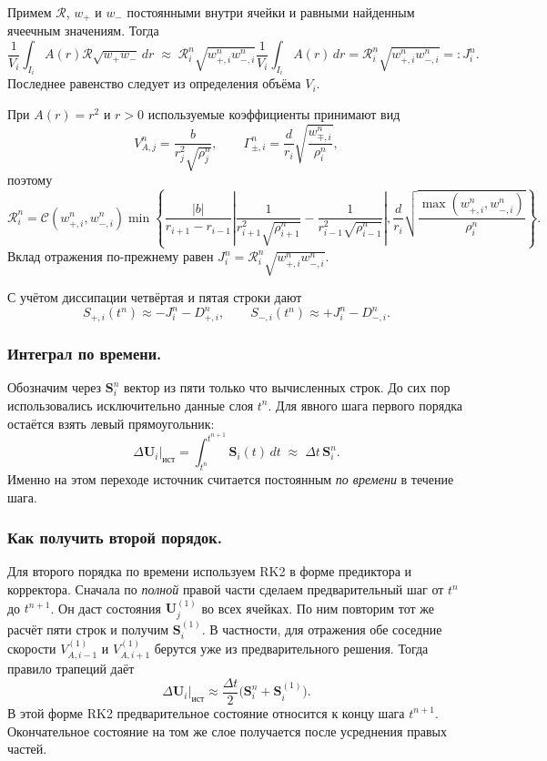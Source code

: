 \documentclass[11pt,a4paper]{article}
\newcommand{\Rref}{\mathcal R}
\providecommand{\U}{}
\renewcommand{\U}{\bm U}
\newcommand{\Src}{\bm S}
\begin{document}
Примем $\Rref$, $w_+$ и $w_-$ постоянными внутри ячейки
и равными найденным ячеечным значениям. Тогда
\[
\frac{1}{V_i}\int_{I_i}
A(r)\Rref\sqrt{w_+w_-}\,dr
\;\approx\;
\Rref_i^n\sqrt{w_{+,i}^n w_{-,i}^n}
\frac{1}{V_i}\int_{I_i}A(r)\,dr
=
\Rref_i^n\sqrt{w_{+,i}^n w_{-,i}^n}
=:J_i^n.
\]
Последнее равенство следует из определения объёма $V_i$.

При $A(r)=r^2$ и $r>0$ используемые коэффициенты принимают вид
\[
V_{A,j}^n=\frac{b}{r_j^2\sqrt{\rho_j^n}},
\qquad
\Gamma_{\pm,i}^n
=\frac{d}{r_i}\sqrt{\frac{w_{\mp,i}^n}{\rho_i^n}},
\]
поэтому
\[
\Rref_i^n=
\mathcal C(w_{+,i}^n,w_{-,i}^n)
\min\!\left\{
\frac{|b|}{r_{i+1}-r_{i-1}}
\left|
\frac{1}{r_{i+1}^2\sqrt{\rho_{i+1}^n}}
-
\frac{1}{r_{i-1}^2\sqrt{\rho_{i-1}^n}}
\right|,
\frac{d}{r_i}
\sqrt{\frac{\max(w_{+,i}^n,w_{-,i}^n)}{\rho_i^n}}
\right\}.
\]
Вклад отражения по-прежнему равен
$J_i^n=\Rref_i^n\sqrt{w_{+,i}^n w_{-,i}^n}$.

С учётом диссипации четвёртая и пятая строки дают
\[
S_{+,i}(t^n)\approx-J_i^n-D_{+,i}^n,
\qquad
S_{-,i}(t^n)\approx+J_i^n-D_{-,i}^n.
\]

\subsubsection{Интеграл по времени.}

Обозначим через $\Src_i^n$ вектор из пяти только что
вычисленных строк. До сих пор использовались исключительно
данные слоя $t^n$. Для явного шага первого порядка остаётся
взять левый прямоугольник:
\[
\left.\Delta\U_i\right|_{\mathrm{ист}}
=\int_{t^n}^{t^{n+1}}\Src_i(t)\,dt
\;\approx\;\Delta t\,\Src_i^n.
\]
Именно на этом переходе источник считается постоянным
\emph{по времени} в течение шага.

\subsubsection{Как получить второй порядок.}

Для второго порядка по времени используем RK2 в форме
предиктора и корректора. Сначала по \emph{полной} правой части
сделаем предварительный шаг от $t^n$ до $t^{n+1}$.
Он даст состояния $\U_j^{(1)}$ во всех ячейках.
По ним повторим тот же расчёт пяти строк и получим
$\Src_i^{(1)}$. В частности, для отражения обе соседние
скорости $V_{A,i-1}^{(1)}$ и $V_{A,i+1}^{(1)}$ берутся
уже из предварительного решения. Тогда правило трапеций даёт
\[
\boxed{
\left.\Delta\U_i\right|_{\mathrm{ист}}
\approx
\frac{\Delta t}{2}\bigl(\Src_i^n+\Src_i^{(1)}\bigr).
}
\]
В этой форме RK2 предварительное состояние относится к концу
шага $t^{n+1}$. Окончательное состояние на том же слое
получается после усреднения правых частей.
\end{document}
